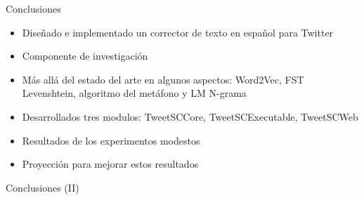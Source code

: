 \begin{tframe}{Conclusiones}
	\begin{itemize}
		\item Dise\~nado e implementado un corrector de texto en espa\~nol para Twitter
		\item Componente de investigaci\'on
		\item M\'as all\'a del estado del arte en algunos aspectos: Word2Vec, FST Levenshtein, algoritmo del met\'afono y LM N-grama
		\item Desarrollados tres modulos: TweetSCCore, TweetSCExecutable, TweetSCWeb
		\item Resultados de los experimentos modestos
		\item Proyecci\'on para mejorar estos resultados
	\end{itemize}
\end{tframe}

\begin{tframe}{Conclusiones (II)}
	\begin{center}
	\end{center}
\end{tframe}